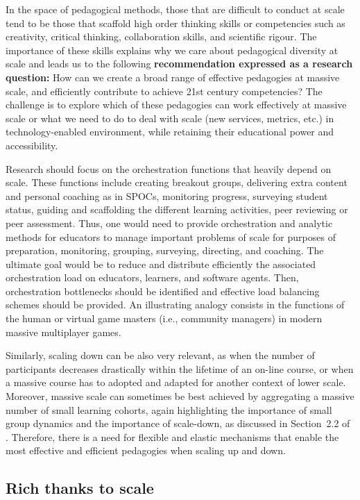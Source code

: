 In the space of pedagogical methods, those that are difficult to conduct
at scale tend to be those that scaffold high order thinking skills or
competencies such as creativity, critical thinking, collaboration
skills, and scientific rigour.  The importance of these skills explains
why we care about pedagogical diversity at scale and leads us to the
following \textbf{recommendation expressed as a research question:} How can we
create a broad range of effective pedagogies at massive scale, and
efficiently contribute to achieve 21st century competencies? The
challenge is to explore which of these pedagogies can work effectively
at massive scale or what we need to do to deal with scale (new services,
metrics, etc.) in technology-enabled environment, while retaining their
educational power and accessibility.

Research should focus on the orchestration functions that heavily depend
on scale. These functions include creating breakout groups, delivering
extra content and personal coaching as in SPOCs, monitoring progress,
surveying student status, guiding and scaffolding the different learning
activities, peer reviewing or peer assessment. Thus, one would need to
provide orchestration and analytic methods for educators to manage
important problems of scale for purposes of preparation, monitoring,
grouping, surveying, directing, and coaching. The ultimate goal would be
to reduce and distribute efficiently the associated orchestration load
on educators, learners, and software agents. Then, orchestration
bottlenecks should be identified and effective load balancing schemes
should be provided. An illustrating analogy consists in the functions of
the human or virtual game masters (i.e., community managers) in modern
massive multiplayer games.

Similarly, scaling down can be also very relevant, as when the number of
participants decreases drastically within the lifetime of an on-line
course, or when a massive course has to adopted and adapted for another
context of lower scale. Moreover, massive scale can sometimes be best
achieved by aggregating a massive number of small learning cohorts,
again highlighting the importance of small group dynamics and the
importance of scale-down,
as discussed in Section~2.2 of \cite{mroe-2013-report}.
Therefore, there is a need for flexible and
elastic mechanisms that enable the most effective and efficient
pedagogies when scaling up and down.  

\subsection{Rich thanks to scale}

